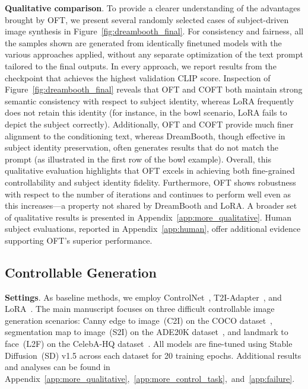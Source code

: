 {\textbf{Qualitative comparison}. To provide a clearer understanding of the advantages brought by OFT, we present several randomly selected cases of subject-driven image synthesis in Figure~\ref{fig:dreambooth_final}. For consistency and fairness, all the samples shown are generated from identically finetuned models with the various approaches applied, without any separate optimization of the text prompt tailored to the final outputs. In every approach, we report results from the checkpoint that achieves the highest validation CLIP score. Inspection of Figure~\ref{fig:dreambooth_final} reveals that OFT and COFT both maintain strong semantic consistency with respect to subject identity, whereas LoRA frequently does not retain this identity (for instance, in the bowl scenario, LoRA fails to depict the subject correctly). Additionally, OFT and COFT provide much finer alignment to the conditioning text, whereas DreamBooth, though effective in subject identity preservation, often generates results that do not match the prompt (as illustrated in the first row of the bowl example). Overall, this qualitative evaluation highlights that OFT excels in achieving both fine-grained controllability and subject identity fidelity. Furthermore, OFT shows robustness with respect to the number of iterations and continues to perform well even as this increases—a property not shared by DreamBooth and LoRA. A broader set of qualitative results is presented in Appendix~\ref{app:more_qualitative}. Human subject evaluations, reported in Appendix~\ref{app:human}, offer additional evidence supporting OFT's superior performance.

\subsection{Controllable Generation}

\textbf{Settings}. As baseline methods, we employ ControlNet~\cite{zhang2023adding}, T2I-Adapter~\cite{mou2023t2i}, and LoRA~\cite{hulora2022}. The main manuscript focuses on three difficult controllable image generation scenarios: Canny edge to image~(C2I) on the COCO dataset~\cite{lin2014microsoft}, segmentation map to image~(S2I) on the ADE20K dataset~\cite{zhou2017scene}, and landmark to face~(L2F) on the CelebA-HQ dataset~\cite{karras2018progressive,xia2021tedigan}. All models are fine-tuned using Stable Diffusion~(SD) v1.5 across each dataset for 20 training epochs. Additional results and analyses can be found in Appendix~\ref{app:more_qualitative},~\ref{app:more_control_task},~and~\ref{app:failure}.

}
